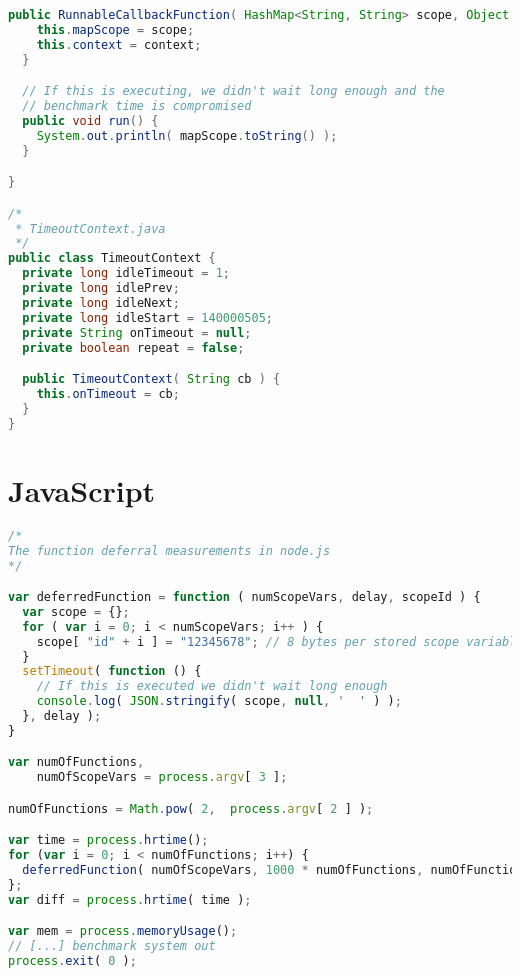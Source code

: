 \begin{lstlisting}[nolol,label=lst_bm_java,language=Java,caption=Closure Benchmarking: Java Code]
  public RunnableCallbackFunction( HashMap<String, String> scope, Object context ) {
    this.mapScope = scope;
    this.context = context;
  }

  // If this is executing, we didn't wait long enough and the
  // benchmark time is compromised
  public void run() {
    System.out.println( mapScope.toString() );
  }

}

/*
 * TimeoutContext.java
 */
public class TimeoutContext {
  private long idleTimeout = 1;
  private long idlePrev;
  private long idleNext;
  private long idleStart = 140000505;
  private String onTimeout = null;
  private boolean repeat = false;

  public TimeoutContext( String cb ) {
    this.onTimeout = cb;
  }
}

\end{lstlisting}

\section{JavaScript}
\begin{lstlisting}[nolol,float=h,label=lst_bm_js,language=JavaScript,caption=Closure Benchmarking: JavaScript Code]
/*
The function deferral measurements in node.js
*/

var deferredFunction = function ( numScopeVars, delay, scopeId ) {
  var scope = {};
  for ( var i = 0; i < numScopeVars; i++ ) {
    scope[ "id" + i ] = "12345678"; // 8 bytes per stored scope variable
  }
  setTimeout( function () {
    // If this is executed we didn't wait long enough
    console.log( JSON.stringify( scope, null, '  ' ) );
  }, delay );
}

var numOfFunctions,
    numOfScopeVars = process.argv[ 3 ];

numOfFunctions = Math.pow( 2,  process.argv[ 2 ] );

var time = process.hrtime();
for (var i = 0; i < numOfFunctions; i++) {
  deferredFunction( numOfScopeVars, 1000 * numOfFunctions, numOfFunctions + "(" + i + ")" );
};
var diff = process.hrtime( time );

var mem = process.memoryUsage();
// [...] benchmark system out
process.exit( 0 );

\end{lstlisting}
